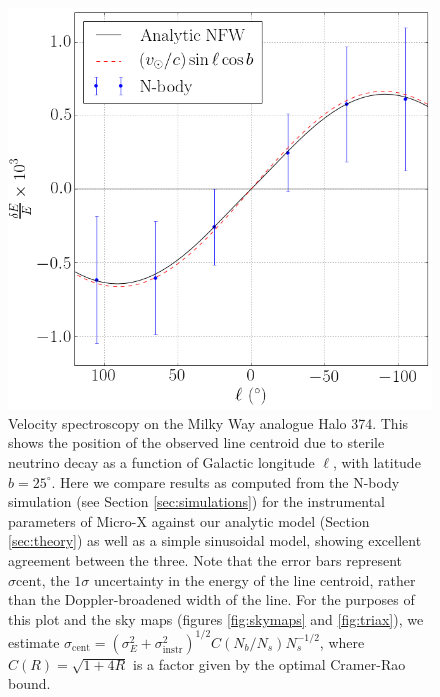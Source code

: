 \documentclass[aps,prd,10pt,twocolumn,superscriptaddress,showpacs]{revtex4-1}
\begin{document}
\begin{figure}[h!]
\includegraphics[width=1.0\columnwidth]{de_vs_l.png}
\caption{Velocity spectroscopy on the Milky Way analogue Halo 374. This shows the position of the observed line centroid due to sterile
	neutrino decay as a function of Galactic longitude $\ell$, with latitude $b=25^\circ$.
	Here we compare results as computed from the N-body simulation (see Section \ref{sec:simulations}) for the
	instrumental parameters of Micro-X against our analytic model (Section
	\ref{sec:theory}) as well as a simple sinusoidal model, showing excellent agreement between the
	three. Note that the error bars represent $\sigma\mathrm{cent}$, the $1\sigma$ uncertainty
	in the energy of the line centroid, rather than the Doppler-broadened width of the line. For the
	purposes of this plot and the sky maps (figures \ref{fig:skymaps} and \ref{fig:triax}), we estimate
	$\sigma_\mathrm{cent} = (\sigma_E^2+\sigma_\mathrm{instr}^2)^{1/2}C(N_b/N_s)N_s^{-1/2}$, where
	$C(R)=\sqrt{1+4R}$ is a factor given by the optimal Cramer-Rao bound.}
\label{fig:de_vs_l}
\end{figure}
\end{document}
